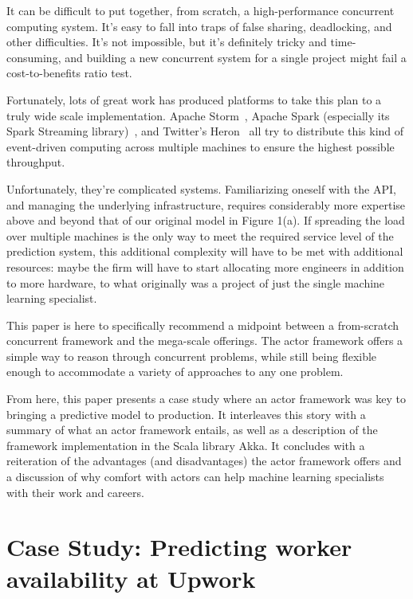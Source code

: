 \documentclass[tablecaption=bottom,wcp]{jmlr}
\begin{document}
 It can be difficult to put together, from scratch, a high-performance
concurrent computing system. It's easy to fall into traps of false sharing,
deadlocking, and other difficulties. It's not impossible, but it's definitely
tricky and time-consuming, and building a new concurrent system for a single
project might fail a cost-to-benefits ratio test.

 Fortunately, lots of great work has produced platforms to take this plan to a
truly wide scale implementation. Apache Storm~\citep{apache_storm}, 
Apache Spark (especially its Spark Streaming library)~\citep{apache_spark}, 
and Twitter's Heron~\citep{kulkarni2015heron} all try to distribute this kind of 
event-driven computing across multiple machines to ensure the highest 
possible throughput.

 Unfortunately, they're complicated systems. Familiarizing oneself with the API,
and managing the underlying infrastructure, requires considerably more expertise
above and beyond that of our original model in Figure 1(a). If spreading the
load over multiple machines is the only way to meet the required service level
of the prediction system, this additional complexity will have to be met with
additional resources: maybe the firm will have to start allocating more
engineers in addition to more hardware, to what originally was a project of just
the single machine learning specialist.

 This paper is here to specifically recommend a midpoint between a from-scratch
concurrent framework and the mega-scale offerings. The actor framework offers a
simple way to reason through concurrent problems, while still being flexible
enough to accommodate a variety of approaches to any one problem.

 From here, this paper presents a case study where an actor framework was key to
bringing a predictive model to production. It interleaves this story with a
summary of what an actor framework entails, as well as a description of the
framework implementation in the Scala library Akka. It concludes with a reiteration
of the advantages (and disadvantages) the actor framework offers and a
discussion of why comfort with actors can help machine learning specialists with
their work and careers.

\section{Case Study: Predicting worker availability at Upwork}
\end{document}

